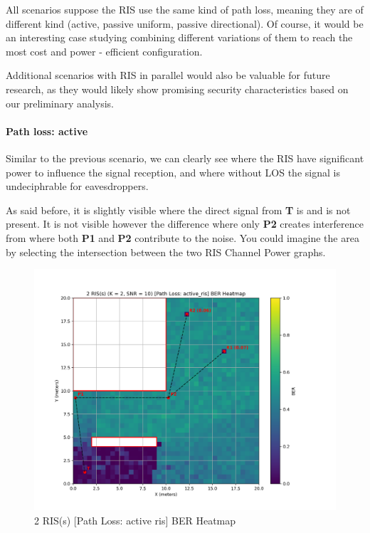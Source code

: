 All scenarios suppose the RIS use the same kind of path loss, meaning they are of different kind (active, passive uniform, passive directional). Of course, it would be an interesting case studying combining different variations of them to reach the most cost and power - efficient configuration.

Additional scenarios with RIS in parallel would also be valuable for future research, as they would likely show promising security characteristics based on our preliminary analysis.

\paragraph*{Path loss: active}
Similar to the previous scenario, we can clearly see where the RIS have significant power to influence the signal reception, and where without LOS the signal is undeciphrable for eavesdroppers.

As said before, it is slightly visible where the direct signal from \textbf{T} is and is not present. It is not visible however the difference where only \textbf{P2} creates interference from where both \textbf{P1} and \textbf{P2} contribute to the noise. You could imagine the area by selecting the intersection between the two RIS Channel Power graphs.

\begin{figure}[H]
  \centering
  \includegraphics[width=0.7\linewidth]{imgs/heatmap-simulations/2 RIS(s) (K = 2, SNR = 10) [Path Loss_ active_ris] BER Heatmap.png}
  \caption{2 RIS(s) [Path Loss: active ris] BER Heatmap}
\end{figure}

